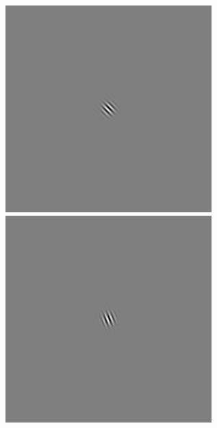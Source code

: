 \begin{figure}[ht]
\begin{center}
 \includegraphics[width=\columnwidth/9]{ch4/figures/rGabor0_6.jpg}
 \includegraphics[width=\columnwidth/9]{ch4/figures/rGabor0_7.jpg}\\

\end{center}
\end{figure}

